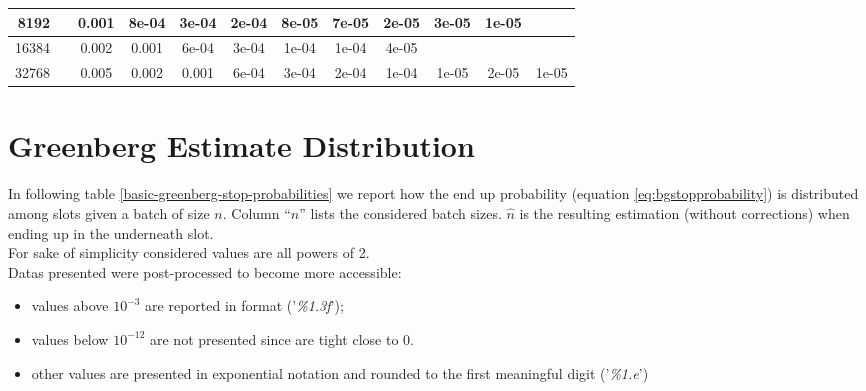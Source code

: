 \begin{appendices}
\begin{table}[H]
{\begin{tabular}{r|ccccccccccc}
8192 &&0.001 &8e-04 &3e-04 &2e-04 &8e-05 &7e-05 &2e-05 &3e-05 &1e-05 &\\\hline

16384 &&0.002 &0.001 &6e-04 &3e-04 &1e-04 &1e-04 &4e-05 &&&\\\hline

32768 &&0.005 &0.002 &0.001 &6e-04 &3e-04 &2e-04 &1e-04 &1e-05 &2e-05 &1e-05\\\hline

\end{tabular}
}
\end{table}




%

\section{Greenberg Estimate Distribution}
In following table \ref{basic-greenberg-stop-probabilities} we report how the end  up probability (equation \ref{eq:bgstopprobability}) is distributed among slots given a batch of size $n$.  Column ``$n$'' lists  the considered batch sizes. $\hat{n}$ is the resulting estimation (without corrections) when ending up in the underneath slot.\\  For sake of simplicity considered values are all powers of 2.\\
Datas presented were post-processed to become more accessible:
\begin{itemize}
\item values above $10^{-3}$ are reported in format ('\emph{\%1.3f}');
\item values below $10^{-12}$ are not presented since are tight close to 0.
\item other values are presented in exponential notation and rounded to the first meaningful digit ('\emph{\%1.e}')
\end{itemize}


\begin{sidewaystable}
\flushleft
{}
\end{sidewaystable}
\end{appendices}
